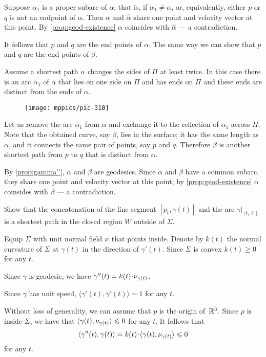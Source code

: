 Suppose $\alpha_1$ is a proper subarc of $\alpha$;
that is, if $\alpha_1\ne\alpha$, or, equivalently, either $p$ or $q$ is not an endpoint of $\alpha$.
Then $\alpha$ and $\hat\alpha$ share one point and velocity vector at this point.
By \ref{prop:geod-existence} $\alpha$ coincides with $\hat\alpha$ --- a contradiction.

It follows that $p$ and $q$ are the end points of $\alpha$.
The same way we can show that $p$ and $q$ are the end points of $\beta$.

Assume a shortest path $\alpha$ changes the sides of $\Pi$ at least twice.
In this case there is an arc $\alpha_1$ of $\alpha$ that lies on one side on $\Pi$ and has ends on $\Pi$ and these ends are distinct from the ends of $\alpha$.

\begin{wrapfigure}{r}{38 mm}
\vskip-0mm
\centering
\texttt{[image: mppics/pic-310]}
\vskip0mm
\end{wrapfigure}

Let us remove the arc $\alpha_1$ from $\alpha$ and exchange it to the reflection of $\alpha_1$ across $\Pi$.
Note that the obtained curve, say $\beta$, lies in the surface; it has the same length as $\alpha$, and it connects the same pair of points, say $p$ and $q$.
Therefore $\beta$ is another shortest path from $p$ to $q$ that is distinct from $\alpha$.

By \ref{prop:gamma''}, $\alpha$ and $\beta$ are geodesics.
Since $\alpha$ and $\beta$ have a common subarc, they share one point and velocity vector at this point;
by \ref{prop:geod-existence} $\alpha$ coinsides with $\beta$ --- a contradiction.



 Show that the concatenation of the line segment $[p_t,\gamma(t)]$ and the arc $\gamma|_{[t,\ell]}$ is a shortest path in the closed region $W$ outside of $\Sigma$.

Equip $\Sigma$ with unit normal field $\nu$ that points inside.
Denote by $k(t)$ the normal curvature of $\Sigma$ at $\gamma(t)$ in the direction of $\gamma'(t)$.
Since $\Sigma$ is convex $k(t)\ge 0$ for any $t$.

Since $\gamma$ is geodesic, we have $\gamma''(t)=k(t)\cdot\Norm_{\gamma(t)}$.

Since $\gamma$ has unit speed, $\langle\gamma'(t),\gamma'(t)\rangle=1$ for any $t$.

Without loss of generality, we can assume that $p$ is the origin of~$\mathbb{R}^3$.
Since $p$ is inside $\Sigma$, we have that $\langle\gamma(t),\nu_{\gamma(t)}\rangle\leqslant 0$ for any $t$.
It follows that 
\[\langle\gamma''(t),\gamma(t)\rangle=k(t)\cdot \langle\gamma(t),\Norm_{\gamma(t)}\rangle\le 0\]
for any $t$.

